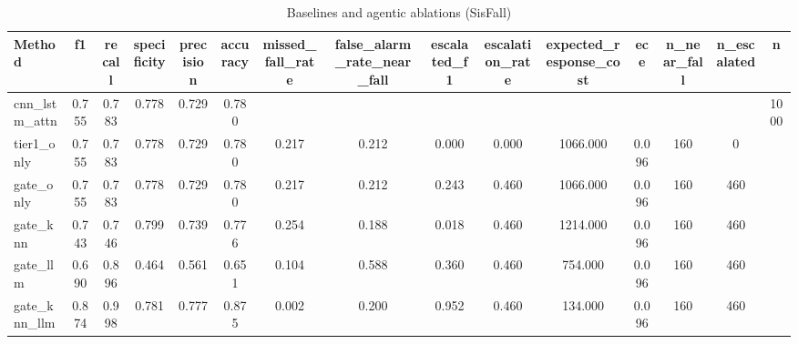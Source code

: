 \begin{table}[t]
\centering
\caption{Baselines and agentic ablations (SisFall)}
\begin{tabular}{lcccccccccccccc}
\toprule
Method & f1 & recall & specificity & precision & accuracy & missed_fall_rate & false_alarm_rate_near_fall & escalated_f1 & escalation_rate & expected_response_cost & ece & n_near_fall & n_escalated & n \\
\midrule
cnn_lstm_attn & 0.755 & 0.783 & 0.778 & 0.729 & 0.780 &  &  &  &  &  &  &  &  & 1000 \\
tier1_only & 0.755 & 0.783 & 0.778 & 0.729 & 0.780 & 0.217 & 0.212 & 0.000 & 0.000 & 1066.000 & 0.096 & 160 & 0 &  \\
gate_only & 0.755 & 0.783 & 0.778 & 0.729 & 0.780 & 0.217 & 0.212 & 0.243 & 0.460 & 1066.000 & 0.096 & 160 & 460 &  \\
gate_knn & 0.743 & 0.746 & 0.799 & 0.739 & 0.776 & 0.254 & 0.188 & 0.018 & 0.460 & 1214.000 & 0.096 & 160 & 460 &  \\
gate_llm & 0.690 & 0.896 & 0.464 & 0.561 & 0.651 & 0.104 & 0.588 & 0.360 & 0.460 & 754.000 & 0.096 & 160 & 460 &  \\
gate_knn_llm & 0.874 & 0.998 & 0.781 & 0.777 & 0.875 & 0.002 & 0.200 & 0.952 & 0.460 & 134.000 & 0.096 & 160 & 460 &  \\
\bottomrule
\end{tabular}
\end{table}